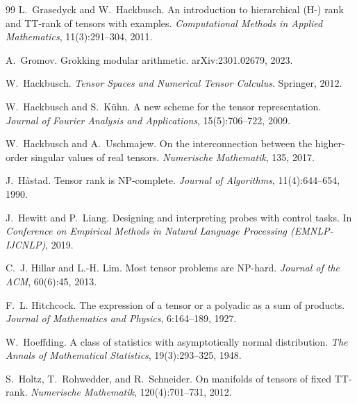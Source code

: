 \documentclass[11pt]{article}
\theoremstyle{definition}
\numberwithin{equation}{section}
\begin{document}
\begin{thebibliography}{99}
L.~Grasedyck and W.~Hackbusch.
\newblock An introduction to hierarchical ({H}-) rank and {TT}-rank of tensors with examples.
\newblock \emph{Computational Methods in Applied Mathematics}, 11(3):291--304, 2011.

A.~Gromov.
\newblock Grokking modular arithmetic.
\newblock arXiv:2301.02679, 2023.

W.~Hackbusch.
\newblock \emph{Tensor Spaces and Numerical Tensor Calculus}.
\newblock Springer, 2012.

W.~Hackbusch and S.~K\"uhn.
\newblock A new scheme for the tensor representation.
\newblock \emph{Journal of Fourier Analysis and Applications}, 15(5):706--722, 2009.

W.~Hackbusch and A.~Uschmajew.
\newblock On the interconnection between the higher-order singular values of real tensors.
\newblock \emph{Numerische Mathematik}, 135, 2017.

J.~H{\aa}stad.
\newblock Tensor rank is {NP}-complete.
\newblock \emph{Journal of Algorithms}, 11(4):644--654, 1990.

J.~Hewitt and P.~Liang.
\newblock Designing and interpreting probes with control tasks.
\newblock In \emph{Conference on Empirical Methods in Natural Language Processing (EMNLP-IJCNLP)}, 2019.

C.~J. Hillar and L.-H. Lim.
\newblock Most tensor problems are {NP}-hard.
\newblock \emph{Journal of the ACM}, 60(6):45, 2013.

F.~L. Hitchcock.
\newblock The expression of a tensor or a polyadic as a sum of products.
\newblock \emph{Journal of Mathematics and Physics}, 6:164--189, 1927.

W.~Hoeffding.
\newblock A class of statistics with asymptotically normal distribution.
\newblock \emph{The Annals of Mathematical Statistics}, 19(3):293--325, 1948.

S.~Holtz, T.~Rohwedder, and R.~Schneider.
\newblock On manifolds of tensors of fixed {TT}-rank.
\newblock \emph{Numerische Mathematik}, 120(4):701--731, 2012.


\end{thebibliography}
\end{document}
